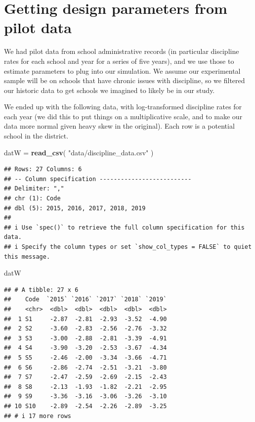 \documentclass[
]{book}
\newenvironment{Shaded}{\begin{snugshade}}{\end{snugshade}}
\newcommand{\FunctionTok}[1]{\textcolor[rgb]{0.13,0.29,0.53}{\textbf{#1}}}
\newcommand{\NormalTok}[1]{#1}
\newcommand{\OtherTok}[1]{\textcolor[rgb]{0.56,0.35,0.01}{#1}}
\newcommand{\StringTok}[1]{\textcolor[rgb]{0.31,0.60,0.02}{#1}}
\begin{document}
\section{Getting design parameters from pilot data}\label{getting-design-parameters-from-pilot-data}

We had pilot data from school administrative records (in particular discipline rates for each school and year for a series of five years), and we use those to estimate parameters to plug into our simulation.
We assume our experimental sample will be on schools that have chronic issues
with discipline, so we filtered our historic data to get schools we imagined to likely be in our study.

We ended up with the following data, with log-transformed discipline rates for each year (we did this to put things on a multiplicative scale, and to make our data more normal given heavy skew in the original). Each row is a potential school in the district.

\begin{Shaded}
\begin{Highlighting}[]
\NormalTok{datW }\OtherTok{=} \FunctionTok{read\_csv}\NormalTok{( }\StringTok{"data/discipline\_data.csv"}\NormalTok{ )}
\end{Highlighting}
\end{Shaded}

\begin{verbatim}
## Rows: 27 Columns: 6
## -- Column specification --------------------------
## Delimiter: ","
## chr (1): Code
## dbl (5): 2015, 2016, 2017, 2018, 2019
## 
## i Use `spec()` to retrieve the full column specification for this data.
## i Specify the column types or set `show_col_types = FALSE` to quiet this message.
\end{verbatim}

\begin{Shaded}
\begin{Highlighting}[]
\NormalTok{datW}
\end{Highlighting}
\end{Shaded}

\begin{verbatim}
## # A tibble: 27 x 6
##    Code  `2015` `2016` `2017` `2018` `2019`
##    <chr>  <dbl>  <dbl>  <dbl>  <dbl>  <dbl>
##  1 S1     -2.87  -2.81  -2.93  -3.52  -4.90
##  2 S2     -3.60  -2.83  -2.56  -2.76  -3.32
##  3 S3     -3.00  -2.88  -2.81  -3.39  -4.91
##  4 S4     -3.90  -3.20  -2.53  -3.67  -4.34
##  5 S5     -2.46  -2.00  -3.34  -3.66  -4.71
##  6 S6     -2.86  -2.74  -2.51  -3.21  -3.80
##  7 S7     -2.47  -2.59  -2.69  -2.15  -2.43
##  8 S8     -2.13  -1.93  -1.82  -2.21  -2.95
##  9 S9     -3.36  -3.16  -3.06  -3.26  -3.10
## 10 S10    -2.89  -2.54  -2.26  -2.89  -3.25
## # i 17 more rows
\end{verbatim}
\end{document}
